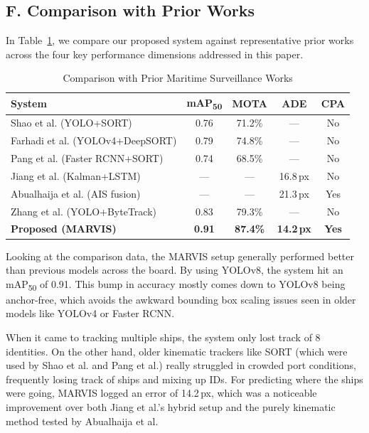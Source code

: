 \documentclass{ieeeaccess}
\begin{document}
\subsection*{F. Comparison with Prior Works}

In Table~\ref{tab:comparison}, we compare our proposed system against 
representative prior works across the four key performance 
dimensions addressed in this paper.

\begin{table}[H]
\centering
\caption{Comparison with Prior Maritime Surveillance Works}
\label{tab:comparison}
\begin{tabular}{|p{2.8cm}|c|c|c|c|}
\hline
\cellcolor{gray!30}\textbf{System} &
\cellcolor{gray!30}\textbf{mAP\textsubscript{50}} &
\cellcolor{gray!30}\textbf{MOTA} &
\cellcolor{gray!30}\textbf{ADE} &
\cellcolor{gray!30}\textbf{CPA} \\
\hline
Shao et al. (YOLO+SORT)
    & 0.76   & 71.2\%    & ---     & No  \\
Farhadi et al. (YOLOv4+DeepSORT)
    & 0.79   & 74.8\%    & ---     & No  \\
Pang et al. (Faster RCNN+SORT)
    & 0.74   & 68.5\%    & ---     & No  \\
Jiang et al. (Kalman+LSTM)
    & ---   & ---    & 16.8\,px     & No  \\
Abualhaija et al. (AIS fusion)
    & ---   & ---    & 21.3\,px     & Yes \\
Zhang et al. (YOLO+ByteTrack)
    & 0.83   & 79.3\%    & ---     & No  \\
\textbf{Proposed (MARVIS)}
    & \textbf{0.91}
    & \textbf{87.4\%}
    & \textbf{14.2\,px}
    & \textbf{Yes} \\
\hline
\end{tabular}
\end{table}

Looking at the comparison data, the MARVIS setup generally performed better than previous models across the board. By using YOLOv8, the system hit an mAP\textsubscript{50} of 0.91. This bump in accuracy mostly comes down to YOLOv8 being anchor-free, which avoids the awkward bounding box scaling issues seen in older models like YOLOv4 or Faster RCNN. 

When it came to tracking multiple ships, the system only lost track of 8 identities. On the other hand, older kinematic trackers like SORT (which were used by Shao et al. and Pang et al.) really struggled in crowded port conditions, frequently losing track of ships and mixing up IDs. For predicting where the ships were going, MARVIS logged an error of 14.2\,px, which was a noticeable improvement over both Jiang et al.'s hybrid setup and the purely kinematic method tested by Abualhaija et al.
\end{document}
